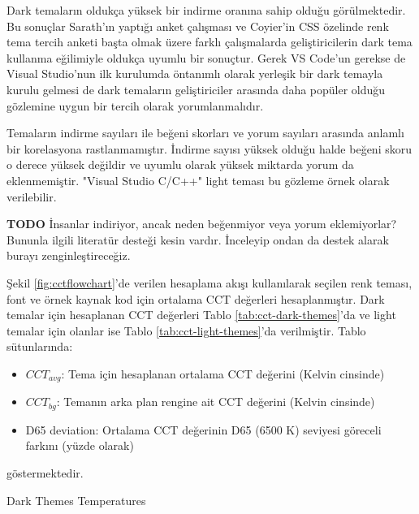 \documentclass{article}
\begin{document}
Dark temaların oldukça yüksek bir indirme oranına sahip olduğu görülmektedir. Bu sonuçlar Sarath'ın yaptığı anket
çalışması \cite{sarath2016prefer} ve Coyier'in CSS özelinde renk tema tercih anketi \cite{coyier2013poll} başta olmak
üzere farklı çalışmalarda geliştiricilerin dark tema kullanma eğilimiyle oldukça uyumlu bir sonuçtur.  Gerek VS Code'un
gerekse de Visual Studio'nun ilk kurulumda öntanımlı olarak yerleşik bir dark temayla kurulu gelmesi de dark temaların
geliştiriciler arasında daha popüler olduğu gözlemine uygun bir tercih olarak yorumlanmalıdır.

Temaların indirme sayıları ile beğeni skorları ve yorum sayıları arasında anlamlı bir korelasyona rastlanmamıştır.
İndirme sayısı yüksek olduğu halde beğeni skoru o derece yüksek değildir ve uyumlu olarak yüksek miktarda yorum da
eklenmemiştir. "Visual Studio C/C++" light teması bu gözleme örnek olarak verilebilir.

\textbf{TODO} İnsanlar indiriyor, ancak neden beğenmiyor veya yorum eklemiyorlar? Bununla ilgili literatür desteği kesin
vardır. İnceleyip ondan da destek alarak burayı zenginleştireceğiz.

Şekil \ref{fig:cctflowchart}'de verilen hesaplama akışı kullanılarak seçilen renk teması, font ve örnek kaynak kod için
ortalama CCT değerleri hesaplanmıştır. Dark temalar için hesaplanan CCT değerleri Tablo \ref{tab:cct-dark-themes}'da ve
light temalar için olanlar ise Tablo \ref{tab:cct-light-themes}'da verilmiştir.  Tablo sütunlarında:

\begin{itemize}
  \item $CCT_{avg}$: Tema için hesaplanan ortalama CCT değerini (Kelvin cinsinde)
  \item $CCT_{bg}$: Temanın arka plan rengine ait CCT değerini (Kelvin cinsinde)
  \item D65 deviation: Ortalama CCT değerinin D65 (6500 K) seviyesi göreceli farkını (yüzde olarak)
\end{itemize}

göstermektedir.


\begin{table}[H]

	\caption{Dark Themes Temperatures}
  \label{tab:cct-dark-themes}
\end{table}
\end{document}
